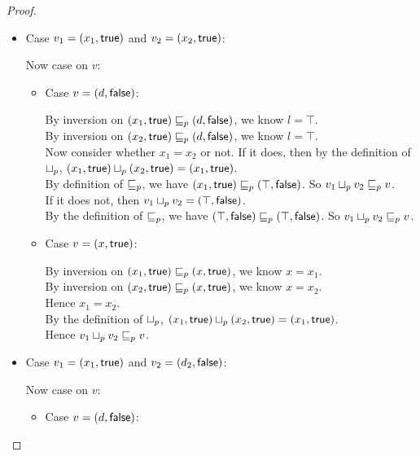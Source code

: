 \begin{proof}
\begin{enumerate}
\begin{enumerate}
\begin{itemize}
   \item Case $v_1 = (x_1, \textsf{true})$ and $v_2 = (x_2, \textsf{true})$: 
  
     Now case on $v$: 
     \begin{itemize}
     \item Case $v = (d, \textsf{false})$: 
  
       By inversion on $(x_1, \textsf{true}) \sqsubseteq_p (d, \textsf{false})$, we know $l = \top$. \\
       By inversion on $(x_2, \textsf{true}) \sqsubseteq_p (d, \textsf{false})$, we know $l = \top$. \\
       Now consider whether $x_1 = x_2$ or not. 
       If it does, then  by the definition of $ \sqcup_p $, $(x_1, \textsf{true})  \sqcup_p  (x_2, \textsf{true}) = (x_1, \textsf{true})$. \\ 
       By definition of $\sqsubseteq_p$, we have $(x_1, \textsf{true}) \sqsubseteq_p (\top, \textsf{false})$. 
       So $v_1 \sqcup_p v_2 \sqsubseteq_p v$. \\ 
       If it does not, then $v_1 \sqcup_p v_2 = (\top, \textsf{false})$. \\ 
       By the definition of $\sqsubseteq_p$, we have $(\top, \textsf{false}) \sqsubseteq_p (\top, \textsf{false})$. 
       So $v_1 \sqcup_p v_2 \sqsubseteq_p v$. 
  
     \item Case $v = (x, \textsf{true})$: 
  
       By inversion on $(x_1, \textsf{true}) \sqsubseteq_p (x, \textsf{true})$, we know $x = x_1$. \\
       By inversion on $(x_2, \textsf{true}) \sqsubseteq_p (x, \textsf{true})$, we know $x = x_2$. \\
       Hence $x_1 = x_2$. \\ 
       By the definition of $ \sqcup_p $, $(x_1, \textsf{true})  \sqcup_p  (x_2, \textsf{true}) = (x_1, \textsf{true})$. \\
       Hence $v_1 \sqcup_p v_2 \sqsubseteq_p v$. 
     \end{itemize}
   
   \item Case $v_1 = (x_1, \textsf{true})$ and $v_2 = (d_2, \textsf{false})$: 
  
     Now case on $v$:
     \begin{itemize}
     \item Case $v = (d, \textsf{false})$: 
     

\end{itemize}
\end{itemize}
\end{enumerate}
\end{enumerate}
\end{proof}
